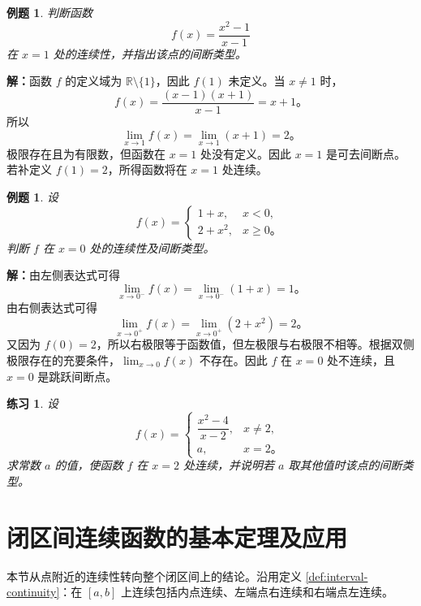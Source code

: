 \documentclass[UTF8,fontset=fandol,11pt]{ctexart}
\newtheorem{example}[definition]{例题}
\newtheorem{exercise}[definition]{练习}
\begin{document}
\begin{example}
判断函数
\[
f(x)=\frac{x^2-1}{x-1}
\]
在 $x=1$ 处的连续性，并指出该点的间断类型。
\end{example}
\par\noindent\textbf{解：}函数 $f$ 的定义域为 $\mathbb{R}\setminus\{1\}$，因此 $f(1)$ 未定义。当 $x\neq1$ 时，
\[
f(x)=\frac{(x-1)(x+1)}{x-1}=x+1\text{。}
\]
所以
\[
\lim_{x\to1}f(x)=\lim_{x\to1}(x+1)=2\text{。}
\]
极限存在且为有限数，但函数在 $x=1$ 处没有定义。因此 $x=1$ 是可去间断点。若补定义 $f(1)=2$，所得函数将在 $x=1$ 处连续。\par
\begin{example}
设
\[
f(x)=
\begin{cases}
1+x,&x<0,\\
2+x^2,&x\geq0\text{。}
\end{cases}
\]
判断 $f$ 在 $x=0$ 处的连续性及间断类型。
\end{example}
\par\noindent\textbf{解：}由左侧表达式可得
\[
\lim_{x\to0^-}f(x)=\lim_{x\to0^-}(1+x)=1\text{。}
\]
由右侧表达式可得
\[
\lim_{x\to0^+}f(x)=\lim_{x\to0^+}(2+x^2)=2\text{。}
\]
又因为 $f(0)=2$，所以右极限等于函数值，但左极限与右极限不相等。根据双侧极限存在的充要条件，$\lim_{x\to0}f(x)$ 不存在。因此 $f$ 在 $x=0$ 处不连续，且 $x=0$ 是跳跃间断点。\par
\begin{exercise}
\label{mathagent:exercise:89dc01d13bdd47d62d3f0c96d9d7bd4201cee6446e15a7269f32977f2b24d58c}
设
\[
f(x)=
\begin{cases}
\dfrac{x^2-4}{x-2},&x\neq2,\\
a,&x=2\text{。}
\end{cases}
\]
求常数 $a$ 的值，使函数 $f$ 在 $x=2$ 处连续，并说明若 $a$ 取其他值时该点的间断类型。
\end{exercise}
\section{闭区间连续函数的基本定理及应用}\label{sec:S05}
本节从点附近的连续性转向整个闭区间上的结论。沿用定义 \ref{def:interval-continuity}：在 $[a,b]$ 上连续包括内点连续、左端点右连续和右端点左连续。
\end{document}
